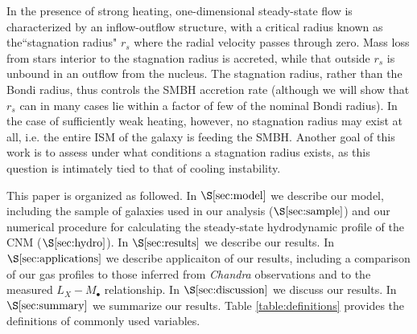 \documentclass[usenatbib,fleqn]{mn2e}
\newcommand{\rs}{r_s}
\newcommand{\Mbh}[1][]{M_{\bullet#1}}
\begin{document}
In the presence of strong heating, one-dimensional steady-state flow is characterized by an inflow-outflow structure, with a critical radius known as the``stagnation radius" $\rs$ where the radial velocity passes through zero.  Mass loss from stars interior to the stagnation radius is accreted, while that outside $\rs$ is unbound in an outflow from the nucleus.  The stagnation radius, rather than the Bondi radius, thus controls the SMBH accretion rate (although we will show that $\rs$ can in many cases lie within a factor of few of the nominal Bondi radius).  In the case of sufficiently weak heating, however, no stagnation radius may exist at all, i.e. the entire ISM of the galaxy is feeding the SMBH.  Another goal of this work is to assess under what conditions a stagnation radius exists, as this question is intimately tied to that of cooling instability.  


This paper is organized as followed.  In $\S\ref{sec:model}$ we
describe our model, including the sample of galaxies used in our
analysis ($\S\ref{sec:sample}$) and our numerical procedure for
calculating the steady-state hydrodynamic profile of the CNM
($\S\ref{sec:hydro}$).  In $\S\ref{sec:results}$ we describe our
results.  In $\S\ref{sec:applications}$ we describe applicaiton of our
results, including a comparison of our gas profiles to those inferred
from {\it Chandra} observations and to the measured $L_X-\Mbh$
relationship.  In $\S\ref{sec:discussion}$ we discuss our results.  In
$\S\ref{sec:summary}$ we summarize our results.  Table \ref{table:definitions} provides the definitions of commonly used variables.
\end{document}
